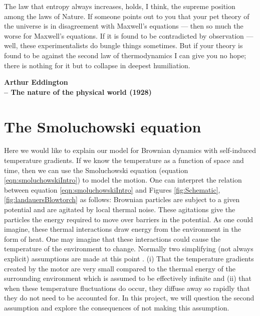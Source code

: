 \epigraph{The law that entropy always increases, holds, I think, the supreme position among the laws of Nature. If someone points out to you that your pet theory of the universe is in disagreement with Maxwell's equations — then so much the worse for Maxwell's equations. If it is found to be contradicted by observation — well, these experimentalists do bungle things sometimes. But if your theory is found to be against the second law of thermodynamics I can give you no hope; there is nothing for it but to collapse in deepest humiliation.}{\textbf{Arthur Eddington \\ -- The nature of the physical world (1928)}}


\section{The Smoluchowski equation} \label{Smoluchowski}
Here we would like to explain our model for Brownian dynamics with self-induced temperature gradients. If we know the temperature as a function of space and time, then we can use the Smoluchowski equation (equation \ref{eqn:smoluchowskiIntro}) to model the motion. One can interpret the relation between equation \ref{eqn:smoluchowskiIntro} and Figures \ref{fig:Schematic}, \ref{fig:landauersBlowtorch} as follows: Brownian particles are subject to a given potential and are agitated by local thermal noise. These agitations give the particles the energy required to move over barriers in the potential. As one could imagine, these thermal interactions draw energy from the environment in the form of heat. One may imagine that these interactions could cause the temperature of the environment to change. Normally two simplifying (not always explicit) assumptions are made at this point \cite{Reimann2001}. (i) That the temperature gradients created by the motor are very small compared to the thermal energy of the surrounding environment which is assumed to be effectively infinite and (ii) that when these temperature fluctuations do occur, they diffuse away so rapidly that they do not need to be accounted for. In this project, we will question the second assumption and explore the consequences of not making this assumption.

